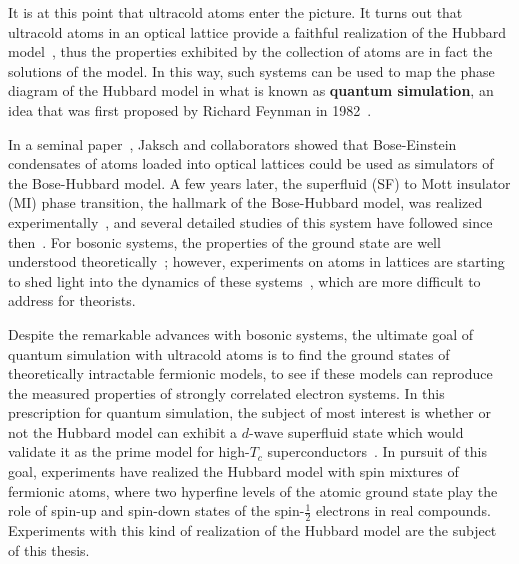 It is at this point that ultracold atoms enter the picture.   It turns out that
ultracold atoms in an optical lattice provide a faithful realization of the
Hubbard model~\cite{PhysRevLett.81.3108}, thus the properties exhibited by the
collection of atoms are in fact the solutions of the model.    In this way,
such systems can be used to map the phase diagram of the Hubbard model in what
is known as \textbf{quantum simulation}, an idea that was first proposed by
Richard Feynman in 1982~\cite{feynman1982simulating}. 

In a seminal paper~\cite{PhysRevLett.81.3108}, Jaksch and collaborators  showed
that Bose-Einstein condensates of atoms loaded into optical lattices could be
used as simulators of the Bose-Hubbard model.  A few years later, the
superfluid (SF) to Mott insulator (MI) phase transition, the hallmark of the
Bose-Hubbard model, was realized experimentally~\cite{Greiner2002}, and several
detailed studies of this system have followed since then~\cite{Gemelke2009,
Jimenez-Garcia2010, Trotzky2010, Mark2011, Zhang2012}.  For bosonic systems,
the properties of the ground state are well understood
theoretically~\cite{freericks1994bosehubbard, trivedi1991mott,
PhysRevB.40.546};  however, experiments on atoms in lattices are starting to
shed light into the dynamics of these systems~\cite{Fukuhara2013}, which are
more difficult to address for theorists.  

Despite the remarkable advances with bosonic systems, the ultimate goal of
quantum simulation with ultracold atoms is to find the ground states of
theoretically intractable fermionic models, to see if these models can
reproduce the measured properties of strongly correlated electron systems.  In
this prescription for quantum simulation, the subject of most interest is
whether or not the Hubbard model can exhibit a $d$-wave superfluid state which
would validate it as the prime model for high-$T_{c}$
superconductors~\cite{Scalapino1995329,PhysRevLett.89.220407}.  In pursuit of
this goal, experiments have realized the Hubbard model with spin mixtures of
fermionic atoms, where two hyperfine levels of the atomic ground state play the
role of spin-up and spin-down states of the spin-$\frac{1}{2}$ electrons in
real compounds.  Experiments with this kind of realization of the Hubbard model
are the subject of this thesis. 

